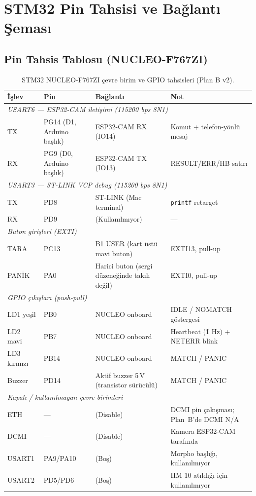 \chapter{STM32 Pin Tahsisi ve Bağlantı Şeması}
\label{app:pin-plani}

\section{Pin Tahsis Tablosu (NUCLEO-F767ZI)}

\begin{table}[h!]
\centering
\caption{STM32 NUCLEO-F767ZI çevre birim ve GPIO tahsisleri (Plan B v2).}
\label{tab:pin-tahsisi}
\small
\begin{tabular}{l l l l}
\toprule
\textbf{İşlev} & \textbf{Pin} & \textbf{Bağlantı} & \textbf{Not}\\
\midrule
\multicolumn{4}{l}{\emph{USART6 --- ESP32-CAM iletişimi (115200 bps 8N1)}}\\
TX & PG14 (D1, Arduino başlık)  & ESP32-CAM RX (IO14) & Komut + telefon-yönlü mesaj\\
RX & PG9  (D0, Arduino başlık)  & ESP32-CAM TX (IO13) & RESULT/ERR/HB satırı\\
\midrule
\multicolumn{4}{l}{\emph{USART3 --- ST-LINK VCP debug (115200 bps 8N1)}}\\
TX & PD8 & ST-LINK (Mac terminal)       & \texttt{printf} retarget\\
RX & PD9 & (Kullanılmıyor)               & ---\\
\midrule
\multicolumn{4}{l}{\emph{Buton girişleri (EXTI)}}\\
TARA  & PC13 & B1 USER (kart üstü mavi buton)        & EXTI13, pull-up\\
PANİK & PA0  & Harici buton (sergi düzeneğinde takılı değil) & EXTI0, pull-up\\
\midrule
\multicolumn{4}{l}{\emph{GPIO çıkışları (push-pull)}}\\
LD1 yeşil   & PB0  & NUCLEO onboard            & IDLE / NOMATCH göstergesi\\
LD2 mavi    & PB7  & NUCLEO onboard            & Heartbeat (\~1 Hz) + NETERR blink\\
LD3 kırmızı & PB14 & NUCLEO onboard            & MATCH / PANIC\\
Buzzer      & PD14 & Aktif buzzer 5\,V (transistor sürücülü) & MATCH / PANIC\\
\midrule
\multicolumn{4}{l}{\emph{Kapalı / kullanılmayan çevre birimleri}}\\
ETH      & --- & (Disable)        & DCMI pin çakışması; Plan~B'de DCMI N/A\\
DCMI     & --- & (Disable)        & Kamera ESP32-CAM tarafında\\
USART1   & PA9/PA10 & (Boş)       & Morpho başlığı, kullanılmıyor\\
USART2   & PD5/PD6  & (Boş)       & HM-10 atıldığı için kullanılmıyor\\
\bottomrule
\end{tabular}
\end{table}

